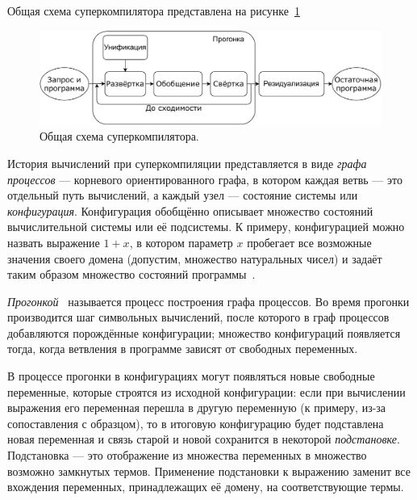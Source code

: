 Общая схема суперкомпилятора представлена на рисунке~\ref{fig:scompScheme}

\begin{figure}[h!]
\center
\includegraphics[scale=0.76]{./review/scompflow.pdf}
\caption{Общая схема суперкомпилятора.}
\label{fig:scompScheme}
\end{figure}

История вычислений при суперкомпиляции представляется в виде \emph{графа процессов} --- корневого ориентированного графа,
в котором каждая ветвь --- это отдельный путь вычислений, а каждый узел --- состояние системы или \emph{конфигурация}.
Конфигурация обобщённо описывает множество состояний вычислительной системы или её подсистемы.
К примеру, конфигурацией можно назвать выражение $1 + x$, в котором параметр $x$ пробегает
все возможные значения своего домена (допустим, множество натуральных чисел) и задаёт
таким образом множество состояний программы~\cite{turchinSC}.

\emph{Прогонкой}~ называется процесс построения графа процессов.
Во время прогонки производится шаг символьных вычислений, после которого
в граф процессов добавляются порождённые конфигурации; множество конфигураций
появляется тогда, когда ветвления в программе зависят от свободных переменных.

В процессе прогонки в конфигурациях могут появляться новые свободные переменные,
которые строятся из исходной конфигурации:
если при вычислении выражения его переменная перешла в другую переменную (к примеру, из-за сопоставления с образцом),
то в итоговую конфигурацию будет подставлена новая переменная и связь старой и новой сохранится в
некоторой \emph{подстановке}.
Подстановка --- это отображение из множества переменных в множество возможно замкнутых термов.
Применение подстановки к выражению заменит все вхождения переменных, принадлежащих её домену,
на соответствующие термы. %

